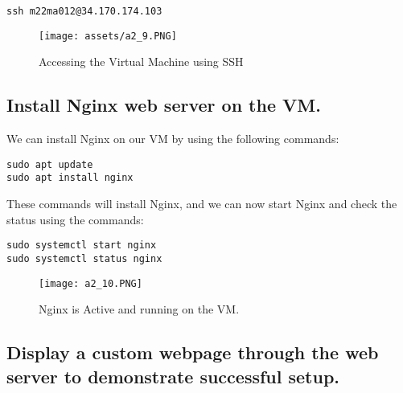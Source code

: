 \documentclass[12pt]{article}
\begin{document}

\begin{listing}[H]
\begin{verbatim}
ssh m22ma012@34.170.174.103 
\end{verbatim}
\end{listing}

\begin{figure}[H]
    \centering
    \texttt{[image: assets/a2\_9.PNG]}
    \caption{Accessing the Virtual Machine using SSH}
    \label{fig:logo}
\end{figure}


\subsection{Install Nginx web server on the VM.}

We can install Nginx on our VM by using the following commands:

\begin{listing}[htbp]
\begin{verbatim}
sudo apt update
sudo apt install nginx
\end{verbatim}
\end{listing}

These commands will install Nginx, and we can now start Nginx and check the status using the commands:

\begin{listing}[H]
\begin{verbatim}
sudo systemctl start nginx
sudo systemctl status nginx
\end{verbatim}
\end{listing}



\begin{figure}[H]
    \centering
    \texttt{[image: a2\_10.PNG]}
    \caption{Nginx is Active and running on the VM.}
    \label{fig:logo}
\end{figure}

\subsection{Display a custom webpage through the web server to demonstrate successful setup.}
\end{document}
